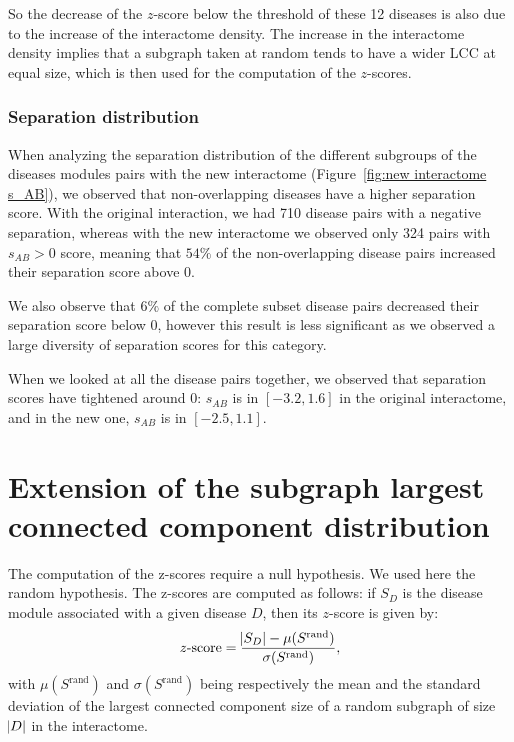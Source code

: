 \documentclass[letterpaper]{article}
\begin{document}
	So the decrease of the $z$-score below the threshold of these 12 diseases is also due to the increase of
	the interactome density. The increase in the interactome density implies that a subgraph taken at random
	tends to have a wider LCC at equal size, which is then used for the computation of the $z$-scores.

\subsubsection{Separation distribution}
	When analyzing the separation distribution of the different subgroups of the diseases modules pairs with
	the new interactome (Figure~\ref{fig:new interactome s_AB}), we observed that non-overlapping diseases have
	a higher separation score. With the original interaction, we had 710 disease pairs with a negative separation,
	whereas with the new interactome we observed only 324 pairs with $s_{AB} > 0$ score, meaning that
	$54\%$ of the non-overlapping disease pairs increased their separation score above 0.

	We also observe that $6\%$ of the complete subset disease pairs decreased their separation score below 0,
	however this result is less significant as we observed a large diversity of separation scores for this category.

	When we looked at all the disease pairs together, we observed that separation scores have tightened around 0:
	$s_{AB}$ is in $[-3.2, 1.6]$ in the original interactome, and in the new one, $s_{AB}$ is in $[-2.5, 1.1]$.


\section{Extension of the subgraph largest connected component distribution}
The computation of the z-scores require a null hypothesis. We used here the random hypothesis. The z-scores
are computed as follows: if $S_D$ is the disease module associated with a given disease $D$, then its
$z$-score is given by:
\begin{equation}
	z\text{-score} = \frac {\abs {S_D} - \mu(S^{\text{rand}})}{\sigma(S^{\text{rand}})},
\end{equation}
with $\mu(S^{\text{rand}})$ and $\sigma(S^{\text{rand}})$ being respectively the mean and the standard
deviation of the largest connected component size of a random subgraph of size $\abs D$ in the interactome.
\end{document}
